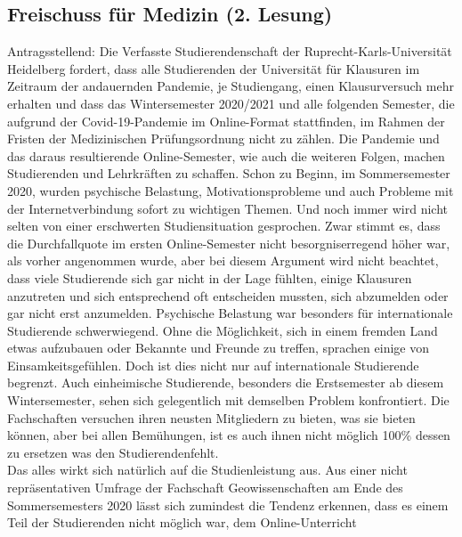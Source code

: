     \subsection{Freischuss für Medizin \label{corona:6} (2. Lesung)}
    Antragsstellend: 
        Die Verfasste Studierendenschaft der Ruprecht-Karls-Universität Heidelberg fordert,
        dass alle
        Studierenden der Universität für Klausuren im Zeitraum der andauernden Pandemie, je
        Studiengang, einen Klausurversuch mehr erhalten und dass das Wintersemester 2020/2021
        und alle
        folgenden Semester, die aufgrund der Covid-19-Pandemie im Online-Format stattfinden,
        im
        Rahmen der Fristen der Medizinischen Prüfungsordnung nicht zu zählen.
        Die Pandemie und das daraus resultierende Online-Semester, wie auch die weiteren Folgen, machen
        Studierenden und Lehrkräften zu schaffen. Schon zu Beginn, im Sommersemester 2020, wurden
        psychische Belastung, Motivationsprobleme und auch Probleme mit der Internetverbindung sofort
        zu wichtigen Themen. Und noch immer wird nicht selten von einer erschwerten Studiensituation
        gesprochen. Zwar stimmt es, dass die Durchfallquote im ersten Online-Semester nicht
        besorgniserregend höher war, als vorher angenommen wurde, aber bei diesem Argument wird nicht
        beachtet, dass viele Studierende sich gar nicht in der Lage fühlten, einige Klausuren anzutreten und
        sich entsprechend oft entscheiden mussten, sich abzumelden oder gar nicht erst anzumelden.
        Psychische Belastung war besonders für internationale Studierende schwerwiegend. Ohne die
        Möglichkeit, sich in einem fremden Land etwas aufzubauen oder Bekannte und Freunde zu treffen,
        sprachen einige von Einsamkeitsgefühlen. Doch ist dies nicht nur auf internationale Studierende
        begrenzt. Auch einheimische Studierende, besonders die Erstsemester ab diesem Wintersemester,
        sehen sich gelegentlich mit demselben Problem konfrontiert. Die Fachschaften versuchen ihren
        neusten Mitgliedern zu bieten, was sie bieten können, aber bei allen Bemühungen, ist es auch ihnen
        nicht möglich 100\% dessen zu ersetzen was den Studierendenfehlt.\\
        Das alles wirkt sich natürlich auf die Studienleistung aus. Aus einer nicht repräsentativen Umfrage
        der Fachschaft Geowissenschaften am Ende des Sommersemesters 2020 lässt sich zumindest die
        Tendenz erkennen, dass es einem Teil der Studierenden nicht möglich war, dem Online-Unterricht
